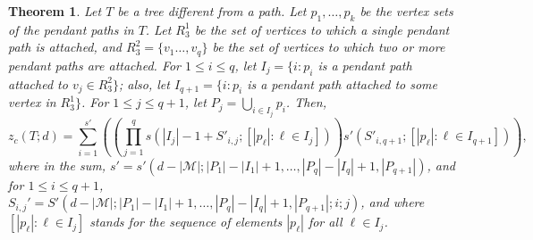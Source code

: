 \documentclass[11pt]{article}
\newtheorem{thm}{Theorem}
\theoremstyle{definition}
\newcommand{\1}{\vspace{0.1cm}}
\newcommand{\2}{\vspace{0.2cm}}
\newcommand{\3}{\vspace{0.3cm}}
\begin{document}
\begin{thm}
\label{theorem_cf_poly_tree}
Let $T$ be a tree different from a path. Let $p_1,\ldots,p_k$ be the vertex sets of the pendant paths in $T$. Let $R_3^1$ be the set of vertices to which a single pendant path is attached, and $R_3^2=\{v_1\ldots,v_q\}$ be the set of vertices to which two or more pendant paths are attached. For $1\leq i\leq q$, let $I_j=\{i: p_i$ is a pendant path attached to $v_j\in R_3^2\}$; also, let $I_{q+1}=\{i: p_i$ is a pendant path attached to some vertex in $R_3^1\}$. For $1\leq j\leq q+1$, let $P_j=\bigcup_{i\in I_j} p_i$. Then, 
\begin{equation*}
z_c(T;d)=\sum_{i=1}^{s'}\left(\left(\prod_{j=1}^q s(|I_j|-1+S'_{i,j};[|p_\ell|:\ell\in I_j])\right)s'(S'_{i,q+1};[|p_\ell|:\ell\in I_{q+1}])\right),
\end{equation*}
where in the sum, $s'=s'(d-|\mathcal{M}|;|P_1|-|I_1|+1,\ldots,|P_q|-|I_q|+1,|P_{q+1}|)$, and for $1\leq i\leq q+1$, $S_{i,j}'=S'(d-|\mathcal{M}|;|P_1|-|I_1|+1,\ldots,|P_q|-|I_q|+1,|P_{q+1}|;i;j)$, and where $[|p_\ell|:\ell\in I_j]$ stands for the sequence of elements $|p_\ell|$ for all $\ell\in I_j$. 


\end{thm}
\end{document}
